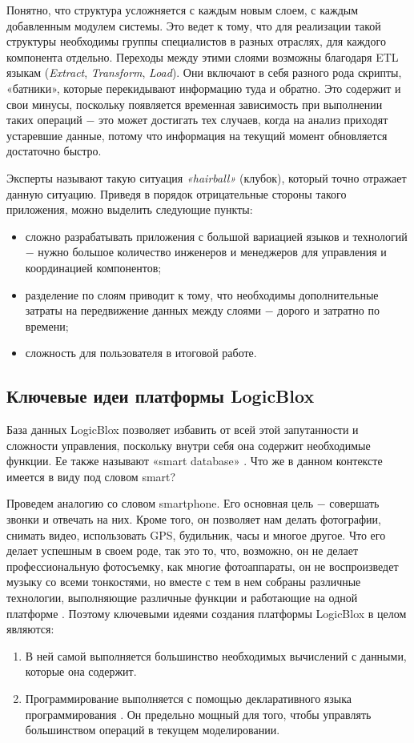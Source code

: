 Понятно, что структура усложняется с каждым новым слоем, с каждым добавленным модулем системы. Это ведет к тому, что для реализации такой структуры необходимы группы специалистов в разных отраслях, для каждого компонента отдельно. Переходы между этими слоями возможны благодаря ETL языкам (\emph{Extract}, \emph{Transform}, \emph{Load}). Они включают в себя разного рода скрипты, «батники», которые перекидывают информацию туда и обратно. Это содержит и свои минусы, поскольку появляется временная зависимость при выполнении таких операций ​− это может достигать тех случаев, когда на анализ приходят устаревшие данные, потому что информация на текущий момент обновляется достаточно быстро.

Эксперты называют такую ситуация \emph{«hairball»} (клубок), который точно отражает данную ситуацию. Приведя в порядок отрицательные стороны такого приложения, можно выделить следующие пункты:
\begin{itemize}
  \item сложно разрабатывать приложения с большой вариацией языков и технологий ​− нужно большое количество инженеров и менеджеров для управления и координацией компонентов;
  \item разделение по слоям приводит к тому, что необходимы дополнительные затраты на передвижение данных между слоями ​− дорого и затратно по времени;
  \item сложность для пользователя в итоговой работе.
\end{itemize}

\subsection{Ключевые идеи платформы LogicBlox}
\label{sec:domain:framework_key_ideas}

База данных LogicBlox позволяет избавить от всей этой запутанности и сложности управления, поскольку внутри себя она содержит необходимые функции. Ее также называют «smart database» \cite{kurt_lecture}. Что же в данном контексте имеется в виду под словом smart?

Проведем аналогию со словом smartphone. Его основная цель ​− совершать звонки и отвечать на них. Кроме того, он позволяет нам делать фотографии, снимать видео, использовать GPS, будильник, часы и многое другое. Что его делает успешным в своем роде, так это то, что, возможно, он не делает профессиональную фотосъемку, как многие фотоаппараты, он не воспроизведет музыку со всеми тонкостями, но вместе с тем в нем собраны различные технологии, выполняющие различные функции и работающие на одной платформе . Поэтому ключевыми идеями создания платформы LogicBlox в целом являются:
\begin{enumerate}
  \item В ней самой выполняется большинство необходимых вычислений с данными, которые она содержит.
  \item Программирование выполняется с помощью декларативного языка программирования \logiql. Он предельно мощный для того, чтобы управлять большинством операций в текущем моделировании.
\end{enumerate}


